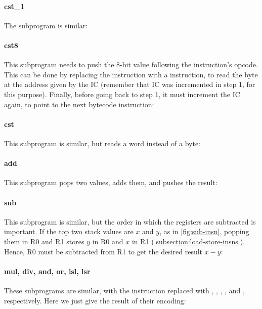 
\paragraph{cst\_1} The  subprogram is similar:


\paragraph{cst8} This subprogram needs to push the 8-bit value following the
instruction's opcode. This can be done by replacing the  instruction
with a  instruction, to read the byte at the address given by the IC
(remember that IC was incremented in step 1, for this purpose). Finally, before
going back to step 1, it must increment the IC again, to point to the next
bytecode instruction:


\paragraph{cst} This subprogram is similar, but reads a word instead of a byte:


\paragraph{add} This subprogram pops two values, adds them, and pushes the
result:


\paragraph{sub} This subprogram is similar, but the order in which the
registers are subtracted is important. If the top two stack values are $x$ and
$y$, as in \cref{fig:sub-insn}, popping them in R0 and R1 stores $y$ in R0 and
$x$ in R1 (\cf \cref{subsection:load-store-insns}). Hence, R0 must be
subtracted from R1 to get the desired result $x-y$:


\paragraph{mul, div, and, or, lsl, lsr} These subprograms are similar, with the
 instruction replaced with , , ,
, and , respectively. Here we just give the result of their
encoding:

